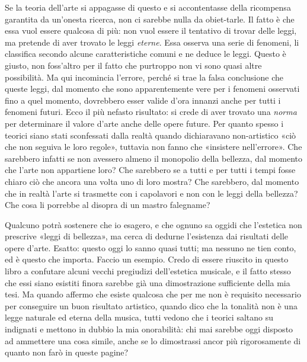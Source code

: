 Se la teoria dell'arte si appagasse di questo e si accontentasse della ricompensa garantita da un'onesta ricerca, non ci sarebbe nulla da obiet-tarle. Il fatto è che essa vuol essere qualcosa di più: non vuol essere il tentativo di trovar delle leggi, ma pretende di aver trovato le leggi \emph{eterne}. Essa osserva una serie di fenomeni, li classifica secondo alcune caratteristiche comuni e ne deduce le leggi. Questo è giusto, non foss'altro per il fatto che purtroppo non vi sono quasi altre possibilità. Ma qui incomincia l'errore, perché si trae la falsa conclusione che queste leggi, dal momento che sono apparentemente vere per i fenomeni osservati fino a quel momento, dovrebbero esser valide d'ora innanzi anche per tutti i fenomeni futuri. Ecco il più nefasto risultato: si crede di aver trovato una \emph{norma} per determinare il valore d'arte anche delle opere future. Per quanto spesso i teorici siano stati sconfessati dalla realtà quando dichiaravano non-artistico «ciò che non seguiva le loro regole», tuttavia non fanno che «insistere nell'errore». Che sarebbero infatti se non avessero almeno il monopolio della bellezza, dal momento che l'arte non appartiene loro? Che sarebbero se a tutti e per tutti i tempi fosse chiaro ciò che ancora una volta uno di loro mostra? Che sarebbero, dal momento che in realtà l'arte si trasmette con i capolavori e non con le leggi della bellezza? Che cosa li porrebbe al disopra di un mastro falegname?

Qualcuno potrà sostenere che io esagero, e che ognuno sa oggidi che l'estetica non prescrive «leggi di bellezza», ma cerca di dedurne l'esistenza dai risultati delle opere d'arte. Esatto: questo oggi lo sanno quasi tutti; ma nessuno ne tien conto, ed è questo che importa. Faccio un esempio. Credo di essere riuscito in questo libro a confutare alcuni vecchi pregiudizi dell'estetica musicale, e il fatto stesso che essi siano esistiti finora sarebbe già una dimostrazione sufficiente della mia tesi. Ma quando affermo che esiste qualcosa che per me non è requisito necessario per conseguire un buon risultato artistico, quando dico che la tonalità non è una legge naturale ed eterna della musica, tutti vedono che i teorici saltano su indignati e mettono in dubbio la mia onorabilità: chi mai sarebbe oggi disposto ad ammettere una cosa simile, anche se lo dimostrassi ancor più rigorosamente di quanto non farò in queste pagine?

